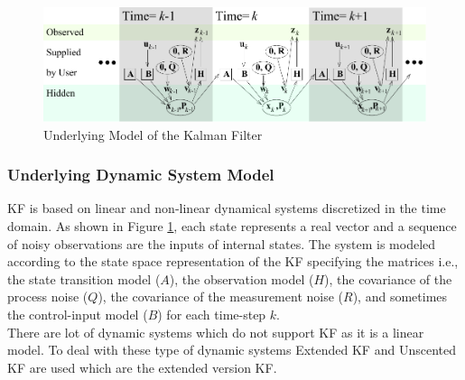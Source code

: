 \begin{figure}
  \centering
  \includegraphics[width=1\textwidth]{src/pic/Kalman_filter_model_2.pdf}
  \caption{Underlying Model of the Kalman Filter \cite{aich2010study}}
  \label{fig:Kalman_filter_model_2}
\end{figure}

\subsubsection{Underlying Dynamic System Model}
KF is based on linear and non-linear dynamical systems discretized in the time domain\cite{bishop2001introduction}. As shown in Figure \ref{fig:Kalman_filter_model_2}, each state represents a real vector and a sequence of noisy observations are the inputs of internal states. The system is modeled according to the state space representation of the KF specifying the matrices i.e., the state transition model ($A$), the observation model ($H$), the covariance of the process noise ($Q$), the covariance of the measurement noise ($R$), and sometimes the control-input model ($B$) for each time-step $k$.\\
There are lot of dynamic systems which do not support KF as it is a linear model\cite{aich2010study}. To deal with these type of dynamic systems Extended KF and Unscented KF are used which are the extended version KF\cite{aich2010study}.

